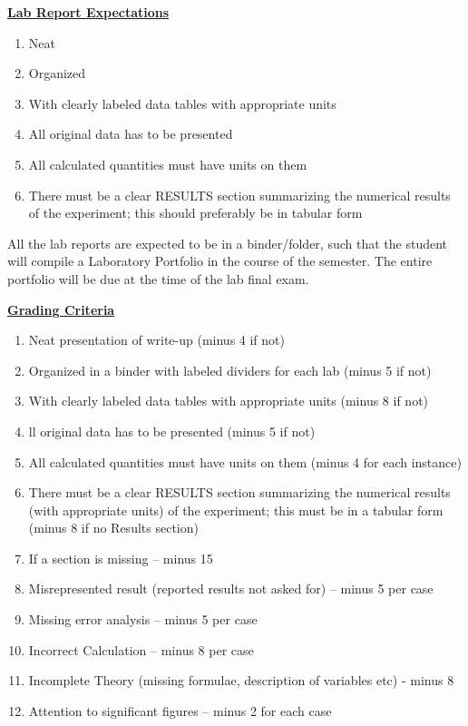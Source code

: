 \documentclass[12pt]{article}
\begin{document}
\underline{\textbf{Lab Report Expectations}} \par
\begin{enumerate}
\item Neat
\item Organized
\item With clearly labeled data tables with appropriate units
\item All original data has to be presented
\item All calculated quantities must have units on them
\item There must be a clear RESULTS section summarizing the numerical results of the experiment; this should preferably be in tabular form
\end{enumerate}
All the lab reports are expected to be in a binder/folder, such that the student will compile a Laboratory Portfolio in the course of the semester.
The entire portfolio will be due at the time of the lab final exam.
\hfill \break

\underline{\textbf{Grading Criteria}} \par
\begin{enumerate}
\item Neat presentation of write-up (minus 4 if not)
\item Organized in a binder with labeled dividers for each lab (minus 5 if not)
\item With clearly labeled data tables with appropriate units (minus 8 if not)
\item ll original data has to be presented (minus 5 if not)
\item All calculated quantities must have units on them (minus 4 for each instance)
\item There must be a clear RESULTS section summarizing the numerical results (with appropriate units) of the experiment; this must be in a tabular form (minus 8 if no Results section)
\item If a section is missing – minus 15
\item Misrepresented result (reported results not asked for) – minus 5 per case
\item Missing error analysis – minus 5 per case
\item Incorrect Calculation – minus 8 per case
\item Incomplete Theory (missing formulae, description of variables etc) - minus 8
\item Attention to significant figures – minus 2 for each case
\end{enumerate}
\end{document}
